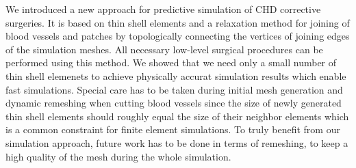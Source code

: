 We introduced a new approach for predictive simulation of CHD corrective surgeries. It is based on thin shell elements and a relaxation method for joining of blood vessels and patches by topologically connecting the vertices of joining edges of the simulation meshes. All necessary low-level surgical procedures can be performed using this method. We showed that we need only a small number of thin shell elemenets to achieve physically accurat simulation results which enable fast simulations. Special care has to be taken during initial mesh generation and dynamic remeshing when cutting blood vessels since the size of newly generated thin shell elements should roughly equal the size of their neighbor elements which is a common constraint for finite element simulations. To truly benefit from our simulation approach, future work has to be done in terms of remeshing, to keep a high quality of the mesh during the whole simulation.
